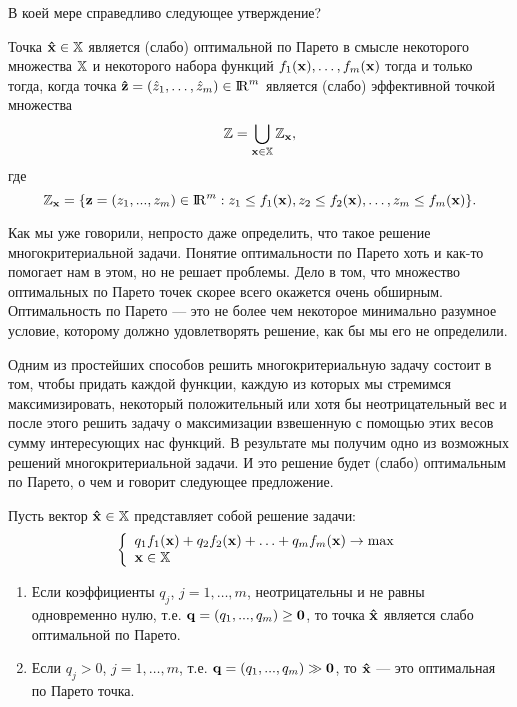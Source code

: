 \begin{exer}
    В коей мере справедливо следующее утверждение?

    Точка $\mathbf{\hat x} \in \mathbb{X}$ является (слабо) оптимальной по Парето в смысле некоторого
    множества $\mathbb{X}$ и некоторого набора функций $f_{1}(\mathbf{x}),\ldots,f_{m}(\mathbf{x})$ тогда
    и только тогда, когда точка $\mathbf{\hat{z}}=(\hat{z}_{1},\ldots,\hat{z}_{m})\in {\rm I\!R}^{m}$
    является (слабо) эффективной точкой множества
\[
    \mathbb{Z}= \mathop \bigcup \limits_{\mathbf{x} \in \mathbb{X}}\mathbb{Z}_{\mathbf{x}},
\]
    где
\[
    \mathbb{Z}_{\mathbf{x}}=\{\mathbf{z}=(z_{1},...,z_{m})\in {\rm I\!R}^m: z_1\leq
    f_1(\mathbf{x}), z_2\leq f_2(\mathbf{x}), \ldots, z_m\leq f_m(\mathbf{x})\}.
\]
\end{exer}

    Как мы уже говорили, непросто даже определить, что такое решение многокритериальной
    задачи. Понятие оптимальности по Парето хоть и как-то помогает нам в этом, но не решает
    проблемы. Дело в том, что множество оптимальных по Парето точек скорее всего окажется
    очень обширным. Оптимальность по Парето --- это не более чем некоторое минимально разумное
    условие, которому должно удовлетворять решение, как бы мы его не определили.


    Одним из простейших способов решить многокритериальную задачу состоит в том, чтобы
    придать каждой функции, каждую из которых мы стремимся максимизировать, некоторый положительный
    или хотя бы неотрицательный вес и после этого решить задачу о максимизации
    взвешенную с помощью этих весов сумму интересующих нас функций. В результате мы получим
    одно из возможных решений многокритериальной задачи. И это решение будет (слабо)
    оптимальным по Парето, о чем и говорит следующее предложение.


\begin{prop}\label{teo:Pareto_opt_conditions}

Пусть вектор $\mathbf{\hat x} \in \mathbb{X}$ представляет собой решение
задачи:
\begin{equation}\label{vzvesh-max}
 \left\{
\begin{array}{l}
    q_1 f_1 (\mathbf{x}) + q_2 f_2 (\mathbf{x}) + \ldots + q_m f_m (\mathbf{x})\to \max  \\
    \mathbf{x} \in \mathbb{X} \\
 \end{array} \right.
\end{equation}

\begin{enumerate}
\renewcommand{\theenumi}{(\roman{enumi})}

\item Если коэффициенты $q_j$, $j=1,\ldots,m$, неотрицательны и  не равны одновременно нулю,
т.е. $\mathbf{q}=(q_{1},...,q_{m}) \geq \mathbf{0}$, то точка $\mathbf{\hat x}$ является слабо
оптимальной по Парето.

\item Если $q_j > 0$, $j=1,\ldots,m$, т.е.
$\mathbf{q}=(q_{1},...,q_{m}) \gg \mathbf{0}$, то $\mathbf{\hat x}$
    --- это оптимальная по Парето точка.
\end{enumerate}
\end{prop}


